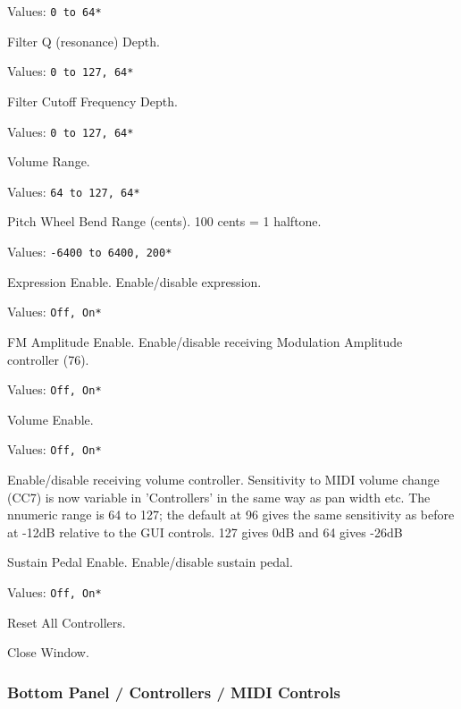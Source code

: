    Values: \texttt{0 to 64*}

   Filter Q (resonance) Depth.

   Values: \texttt{0 to 127, 64*}

   Filter Cutoff Frequency Depth.

   Values: \texttt{0 to 127, 64*}

   Volume Range.

   Values: \texttt{64 to 127, 64*}

   Pitch Wheel Bend Range (cents).
   100 cents = 1 halftone.

   Values: \texttt{-6400 to 6400, 200*}

   Expression Enable.
   Enable/disable expression.

   Values: \texttt{Off, On*}

   FM Amplitude Enable.
   Enable/disable receiving Modulation Amplitude controller (76).

   Values: \texttt{Off, On*}

   Volume Enable.

   Values: \texttt{Off, On*}

   Enable/disable receiving volume controller.
   Sensitivity to MIDI volume change (CC7) is now variable in 'Controllers'
   in the same way as pan width etc. The nnumeric range is 64 to 127; the
   default at 96 gives the same sensitivity as before at -12dB relative to
   the GUI controls. 127 gives 0dB and 64 gives -26dB

   Sustain Pedal Enable.
   Enable/disable sustain pedal.

   Values: \texttt{Off, On*}

   Reset All Controllers.

   Close Window.

\subsubsection{Bottom Panel / Controllers / MIDI Controls}
\label{subsubsec:bottom_panel_controllers_midi_controls}

